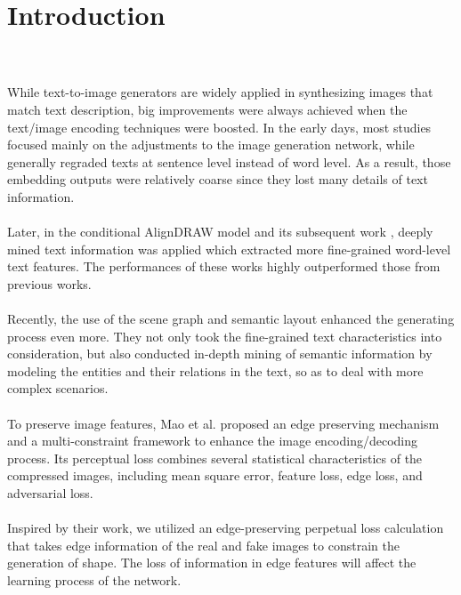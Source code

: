 \documentclass[10pt,twocolumn,letterpaper]{article}
\begin{document}
\section{Introduction}
\\\\
\noindent While text-to-image generators are widely applied in synthesizing images that match text description, big improvements were always achieved when the text/image encoding techniques were boosted. In the early days, most studies focused mainly on the adjustments to the image generation network, while generally regraded texts at sentence level instead of word level. As a result, those embedding outputs were relatively coarse since they lost many details of text information.
\\\\
Later, in the conditional AlignDRAW model \cite{mansimov2015generating} and its subsequent work \cite{zhang2018stackgan++, xu2018attngan}, deeply mined text information was applied which extracted more fine-grained word-level text features. The performances of these works highly outperformed those from previous works. 
\\\\
Recently, the use of the scene graph \cite{johnson2018image} and semantic layout \cite{hong2018inferring} enhanced the generating process even more. They not only took the fine-grained text characteristics into consideration, but also conducted in-depth mining of semantic information by modeling the entities and their relations in the text, so as to deal with more complex scenarios. 
\\\\
To preserve image features, Mao et al. \cite{mao2018enhanced} proposed an edge preserving mechanism and a multi-constraint framework to enhance the image encoding/decoding process. Its perceptual loss combines several statistical characteristics of the compressed images, including mean square error, feature loss, edge loss, and adversarial loss. 
\\\\
Inspired by their work, we utilized an edge-preserving perpetual loss calculation that takes edge information of the real and fake images to constrain the generation of shape. The loss of information in edge features will affect the learning process of the network.
\\
\end{document}
